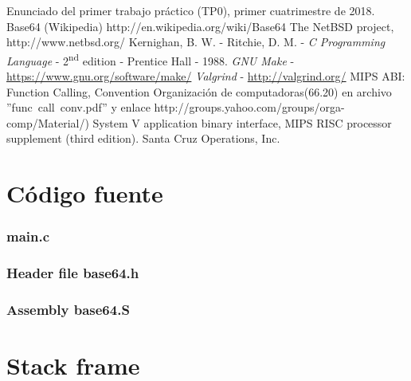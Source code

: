 \documentclass[11pt,a4paper]{article}
\begin{document}
\begin{thebibliography}{10}
	\bibitem{}Enunciado del primer trabajo práctico (TP0), primer cuatrimestre de 2018.
	\bibitem{}Base64 (Wikipedia) http://en.wikipedia.org/wiki/Base64
	\bibitem{}The NetBSD project, http://www.netbsd.org/
	 Kernighan, B. W. - Ritchie, D. M. - \emph{C Programming Language} - 2\textsuperscript{nd} edition - Prentice Hall - 1988.
	 \emph{GNU Make} - \hyperlink{make}{https://www.gnu.org/software/make/}
	 \emph{Valgrind} - \hyperlink{valgrind}{http://valgrind.org/}
	\bibitem{}MIPS ABI: Function Calling, Convention Organización de computadoras(66.20) en archivo ''func\ call\ conv.pdf'' y enlace http://groups.yahoo.com/groups/orga-comp/Material/)
	\bibitem{}System V application binary interface, MIPS RISC processor supplement
(third edition). Santa Cruz Operations, Inc.
\end{thebibliography}
\newpage
\appendix
\section{Código fuente}\label{appendix_codigo_fuente}

\subsubsection{main.c}\label{main}


\newpage

\subsubsection{Header file base64.h}\label{base64.h}


\newpage

\subsubsection{Assembly base64.S}\label{base64.S}




\newpage

\section{Stack frame}
\end{document}
